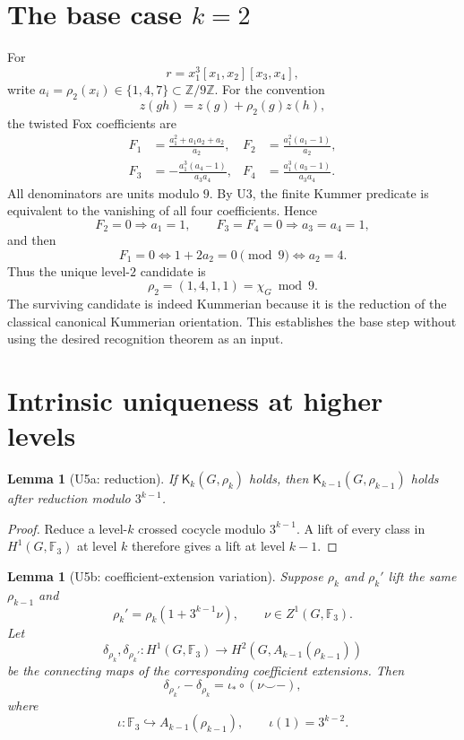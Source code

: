 \documentclass[11pt]{article}
\newtheorem{lemma}[theorem]{Lemma}
\begin{document}
\section{The base case $k=2$}

For
\[
r=x_1^3[x_1,x_2][x_3,x_4],
\]
write $a_i=\rho_2(x_i)\in\{1,4,7\}\subset\mathbb Z/9\mathbb Z$.
For the convention
\[
z(gh)=z(g)+\rho_2(g)z(h),
\]
the twisted Fox coefficients are
\[
\begin{aligned}
F_1&=\frac{a_1^2+a_1a_2+a_2}{a_2},
&
F_2&=\frac{a_1^2(a_1-1)}{a_2},
\\
F_3&=-\frac{a_1^3(a_4-1)}{a_3a_4},
&
F_4&=\frac{a_1^3(a_3-1)}{a_3a_4}.
\end{aligned}
\]
All denominators are units modulo $9$. By U3, the finite Kummer predicate
is equivalent to the vanishing of all four coefficients. Hence
\[
F_2=0\Rightarrow a_1=1,\qquad
F_3=F_4=0\Rightarrow a_3=a_4=1,
\]
and then
\[
F_1=0
\Longleftrightarrow
1+2a_2=0\pmod9
\Longleftrightarrow
a_2=4.
\]
Thus the unique level-$2$ candidate is
\[
\boxed{\rho_2=(1,4,1,1)=\chi_G\bmod9.}
\]
The surviving candidate is indeed Kummerian because it is the reduction
of the classical canonical Kummerian orientation. This establishes the
base step without using the desired recognition theorem as an input.

\section{Intrinsic uniqueness at higher levels}

\begin{lemma}[U5a: reduction]
If $\mathsf K_k(G,\rho_k)$ holds, then
$\mathsf K_{k-1}(G,\rho_{k-1})$ holds after reduction modulo $3^{k-1}$.
\end{lemma}

\begin{proof}
Reduce a level-$k$ crossed cocycle modulo $3^{k-1}$.
A lift of every class in $H^1(G,\mathbb F_3)$ at level $k$ therefore
gives a lift at level $k-1$.
\end{proof}

\begin{lemma}[U5b: coefficient-extension variation]
Suppose $\rho_k$ and $\rho_k'$ lift the same $\rho_{k-1}$ and
\[
\rho_k'=\rho_k(1+3^{k-1}\nu),
\qquad \nu\in Z^1(G,\mathbb F_3).
\]
Let
\[
\delta_{\rho_k},\delta_{\rho_k'}:
H^1(G,\mathbb F_3)
\longrightarrow
H^2(G,A_{k-1}(\rho_{k-1}))
\]
be the connecting maps of the corresponding coefficient extensions.
Then
\[
\boxed{
\delta_{\rho_k'}-\delta_{\rho_k}
=
\iota_*\circ(\nu\smile-),
}
\]
where
\[
\iota:\mathbb F_3\hookrightarrow A_{k-1}(\rho_{k-1}),
\qquad
\iota(1)=3^{k-2}.
\]
\end{lemma}
\end{document}
